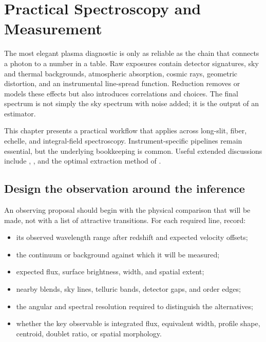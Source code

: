 
\chapter{Practical Spectroscopy and Measurement}
\label{chap:practical-spectroscopy}

The most elegant plasma diagnostic is only as reliable as the chain that connects a
photon to a number in a table.  Raw exposures contain detector signatures, sky and
thermal backgrounds, atmospheric absorption, cosmic rays, geometric distortion, and
an instrumental line-spread function.  Reduction removes or models these effects but
also introduces correlations and choices.  The final spectrum is not simply the sky
spectrum with noise added; it is the output of an estimator.

This chapter presents a practical workflow that applies across long-slit, fiber,
echelle, and integral-field spectroscopy.  Instrument-specific pipelines remain
essential, but the underlying bookkeeping is common.  Useful extended discussions
include \citet{Gray2005}, \citet{Howell2006}, and the optimal extraction method of
\citet{Horne1986}.

\section{Design the observation around the inference}

An observing proposal should begin with the physical comparison that will be made,
not with a list of attractive transitions.  For each required line, record:
\begin{itemize}
 \item its observed wavelength range after redshift and expected velocity offsets;
 \item the continuum or background against which it will be measured;
 \item expected flux, surface brightness, width, and spatial extent;
 \item nearby blends, sky lines, telluric bands, detector gaps, and order edges;
 \item the angular and spectral resolution required to distinguish the alternatives;
 \item whether the key observable is integrated flux, equivalent width, profile
 shape, centroid, doublet ratio, or spatial morphology.
\end{itemize}

